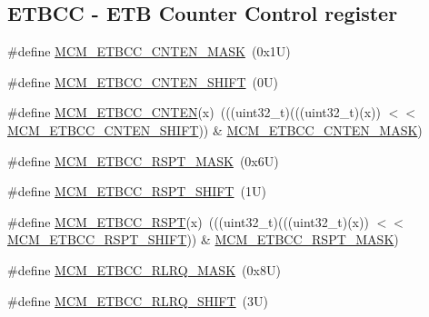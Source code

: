 \subsection*{E\+T\+B\+CC -\/ E\+TB Counter Control register}
\begin{DoxyCompactItemize}
\item 
\#define \mbox{\hyperlink{group___m_c_m___register___masks_gaaffa6b23f821bd7647db6b0abcaf504a}{M\+C\+M\+\_\+\+E\+T\+B\+C\+C\+\_\+\+C\+N\+T\+E\+N\+\_\+\+M\+A\+SK}}~(0x1\+U)
\item 
\#define \mbox{\hyperlink{group___m_c_m___register___masks_ga8262666b7fec7b20ea3e871bdb325dc1}{M\+C\+M\+\_\+\+E\+T\+B\+C\+C\+\_\+\+C\+N\+T\+E\+N\+\_\+\+S\+H\+I\+FT}}~(0\+U)
\item 
\#define \mbox{\hyperlink{group___m_c_m___register___masks_gab78974191542263ca54622dad56cafb1}{M\+C\+M\+\_\+\+E\+T\+B\+C\+C\+\_\+\+C\+N\+T\+EN}}(x)~(((uint32\+\_\+t)(((uint32\+\_\+t)(x)) $<$$<$ \mbox{\hyperlink{group___m_c_m___register___masks_ga8262666b7fec7b20ea3e871bdb325dc1}{M\+C\+M\+\_\+\+E\+T\+B\+C\+C\+\_\+\+C\+N\+T\+E\+N\+\_\+\+S\+H\+I\+FT}})) \& \mbox{\hyperlink{group___m_c_m___register___masks_gaaffa6b23f821bd7647db6b0abcaf504a}{M\+C\+M\+\_\+\+E\+T\+B\+C\+C\+\_\+\+C\+N\+T\+E\+N\+\_\+\+M\+A\+SK}})
\item 
\#define \mbox{\hyperlink{group___m_c_m___register___masks_ga155cfa2bfc46e64c665a8aeed061da6f}{M\+C\+M\+\_\+\+E\+T\+B\+C\+C\+\_\+\+R\+S\+P\+T\+\_\+\+M\+A\+SK}}~(0x6\+U)
\item 
\#define \mbox{\hyperlink{group___m_c_m___register___masks_ga7e85c0a405fa8e736ea6b11e2a2ce2cf}{M\+C\+M\+\_\+\+E\+T\+B\+C\+C\+\_\+\+R\+S\+P\+T\+\_\+\+S\+H\+I\+FT}}~(1\+U)
\item 
\#define \mbox{\hyperlink{group___m_c_m___register___masks_ga7855e4b02297a6ed3202b7ee2bb536f5}{M\+C\+M\+\_\+\+E\+T\+B\+C\+C\+\_\+\+R\+S\+PT}}(x)~(((uint32\+\_\+t)(((uint32\+\_\+t)(x)) $<$$<$ \mbox{\hyperlink{group___m_c_m___register___masks_ga7e85c0a405fa8e736ea6b11e2a2ce2cf}{M\+C\+M\+\_\+\+E\+T\+B\+C\+C\+\_\+\+R\+S\+P\+T\+\_\+\+S\+H\+I\+FT}})) \& \mbox{\hyperlink{group___m_c_m___register___masks_ga155cfa2bfc46e64c665a8aeed061da6f}{M\+C\+M\+\_\+\+E\+T\+B\+C\+C\+\_\+\+R\+S\+P\+T\+\_\+\+M\+A\+SK}})
\item 
\#define \mbox{\hyperlink{group___m_c_m___register___masks_ga16853921aa4b5ded12e5bf4d2c8509fb}{M\+C\+M\+\_\+\+E\+T\+B\+C\+C\+\_\+\+R\+L\+R\+Q\+\_\+\+M\+A\+SK}}~(0x8\+U)
\item 
\#define \mbox{\hyperlink{group___m_c_m___register___masks_ga9ea97398989700f275f186a44b5d86b7}{M\+C\+M\+\_\+\+E\+T\+B\+C\+C\+\_\+\+R\+L\+R\+Q\+\_\+\+S\+H\+I\+FT}}~(3\+U)

\end{DoxyCompactItemize}
